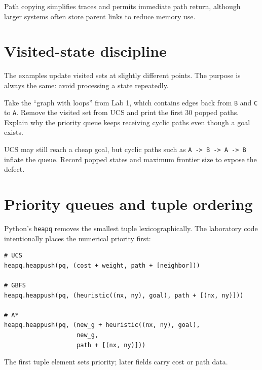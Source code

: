 \begin{intuition}
Path copying simplifies traces and permits immediate path return, although larger systems often store parent links to reduce memory use.
\end{intuition}

\section{Visited-state discipline}

The examples update visited sets at slightly different points. The purpose is always the same: avoid processing a state repeatedly.

\begin{debugtask}
Take the ``graph with loops'' from Lab 1, which contains edges back from \texttt{B} and \texttt{C} to \texttt{A}. Remove the visited set from UCS and print the first 30 popped paths. Explain why the priority queue keeps receiving cyclic paths even though a goal exists.
\end{debugtask}

UCS may still reach a cheap goal, but cyclic paths such as \texttt{A -> B -> A -> B} inflate the queue. Record popped states and maximum frontier size to expose the defect.

\section{Priority queues and tuple ordering}

Python's \texttt{heapq} removes the smallest tuple lexicographically. The laboratory code intentionally places the numerical priority first:

\begin{lstlisting}[style=mlpython]
# UCS
heapq.heappush(pq, (cost + weight, path + [neighbor]))

# GBFS
heapq.heappush(pq, (heuristic((nx, ny), goal), path + [(nx, ny)]))

# A*
heapq.heappush(pq, (new_g + heuristic((nx, ny), goal),
                    new_g,
                    path + [(nx, ny)]))
\end{lstlisting}

The first tuple element sets priority; later fields carry cost or path data.

